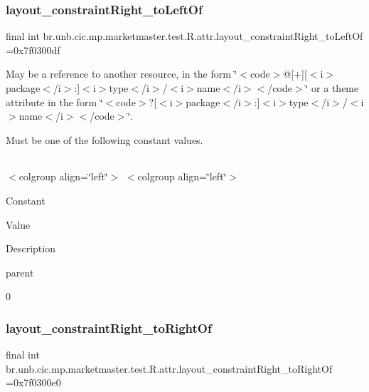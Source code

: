\subsubsection{\texorpdfstring{layout\+\_\+constraint\+Right\+\_\+to\+Left\+Of}{layout\_constraintRight\_toLeftOf}}
{\footnotesize\ttfamily final int br.\+unb.\+cic.\+mp.\+marketmaster.\+test.\+R.\+attr.\+layout\+\_\+constraint\+Right\+\_\+to\+Left\+Of =0x7f0300df\hspace{0.3cm}{\ttfamily [static]}}

May be a reference to another resource, in the form \char`\"{}$<$code$>$@\mbox{[}+\mbox{]}\mbox{[}$<$i$>$package$<$/i$>$\+:\mbox{]}$<$i$>$type$<$/i$>$/$<$i$>$name$<$/i$>$$<$/code$>$\char`\"{} or a theme attribute in the form \char`\"{}$<$code$>$?\mbox{[}$<$i$>$package$<$/i$>$\+:\mbox{]}$<$i$>$type$<$/i$>$/$<$i$>$name$<$/i$>$$<$/code$>$\char`\"{}. 

Must be one of the following constant values.

\tabulinesep=1mm
\begin{longtabu} spread 0pt [c]{*{0}{|X[-1]}|}
\hline
\end{longtabu}
$<$colgroup align=\char`\"{}left\char`\"{}$>$ $<$colgroup align=\char`\"{}left\char`\"{}$>$ 

Constant

Value

Description 

parent

0\mbox{\label{classbr_1_1unb_1_1cic_1_1mp_1_1marketmaster_1_1test_1_1R_1_1attr_acec002a374a6e814a4c37ecc13a6885d}} 
\subsubsection{\texorpdfstring{layout\+\_\+constraint\+Right\+\_\+to\+Right\+Of}{layout\_constraintRight\_toRightOf}}
{\footnotesize\ttfamily final int br.\+unb.\+cic.\+mp.\+marketmaster.\+test.\+R.\+attr.\+layout\+\_\+constraint\+Right\+\_\+to\+Right\+Of =0x7f0300e0\hspace{0.3cm}{\ttfamily [static]}}

